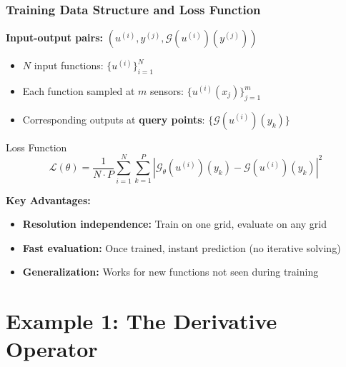 \documentclass[notes]{beamer}
\begin{document}
\begin{frame}
\frametitle{Training Data Structure and Loss Function}

\textbf{Input-output pairs:} $(u^{(i)}, y^{(j)}, \mathcal{G}(u^{(i)})(y^{(j)}))$

\begin{itemize}
    \item \textbf{$N$} input functions: $\{u^{(i)}\}_{i=1}^N$
    \item Each function sampled at \textbf{$m$} sensors: $\{u^{(i)}(x_j)\}_{j=1}^m$
    \item Corresponding outputs at \textbf{query points}: $\{\mathcal{G}(u^{(i)})(y_k)\}$
\end{itemize}

\begin{block}{Loss Function}
\begin{equation*}
\mathcal{L}(\theta) = \frac{1}{N \cdot P} \sum_{i=1}^N \sum_{k=1}^P \left|\mathcal{G}_\theta(u^{(i)})(y_k) - \mathcal{G}(u^{(i)})(y_k)\right|^2
\end{equation*}
\end{block}

\textbf{Key Advantages:}
\begin{itemize}
    \item \textbf{Resolution independence:} Train on one grid, evaluate on any grid
    \item \textbf{Fast evaluation:} Once trained, instant prediction (no iterative solving)
    \item \textbf{Generalization:} Works for new functions not seen during training
\end{itemize}

\end{frame}

\section{Example 1: The Derivative Operator}
\end{document}
